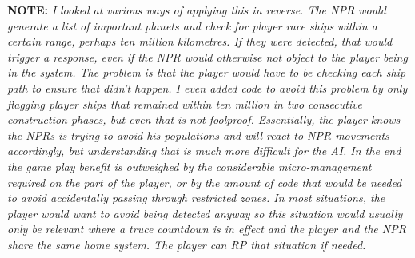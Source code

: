 \documentclass[../../Aurora C# unofficial manual.tex]{subfiles}
\begin{document}
	\textbf{NOTE:} \textit{I looked at various ways of applying this in reverse. The NPR would generate a list of important planets and check for player race ships within a certain range, perhaps ten million kilometres. If they were detected, that would trigger a response, even if the NPR would otherwise not object to the player being in the system. The problem is that the player would have to be checking each ship path to ensure that didn't happen. I even added code to avoid this problem by only flagging player ships that remained within ten million in two consecutive construction phases, but even that is not foolproof. Essentially, the player knows the NPRs is trying to avoid his populations and will react to NPR movements accordingly, but understanding that is much more difficult for the AI. In the end the game play benefit is outweighed by the considerable micro-management required on the part of the player, or by the amount of code that would be needed to avoid accidentally passing through restricted zones. In most situations, the player would want to avoid being detected anyway so this situation would usually only be relevant where a truce countdown is in effect and the player and the NPR share the same home system. The player can RP that situation if needed.}
\end{document}
